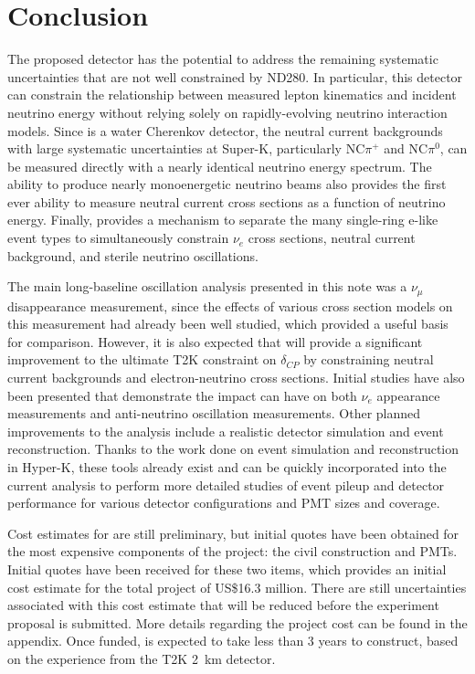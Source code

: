 \section{Conclusion}

The proposed \nuprismlite detector has the potential to address the remaining systematic uncertainties that are not well constrained by ND280. In particular, this detector can constrain the relationship between measured lepton kinematics and incident neutrino energy without relying solely on rapidly-evolving neutrino interaction models. Since \nuprismlite is a water Cherenkov detector, the neutral current backgrounds with large systematic uncertainties at Super-K, particularly NC$\pi^+$ and NC$\pi^0$, can be measured directly with a nearly identical neutrino energy spectrum. The ability to produce nearly monoenergetic neutrino beams also provides the first ever ability to measure neutral current cross sections as a function of neutrino energy. Finally, \nuprismlite provides a mechanism to separate the many single-ring e-like event types to simultaneously constrain $\nu_e$ cross sections, neutral current background, and sterile neutrino oscillations.

The main long-baseline oscillation analysis presented in this note was a $\nu_\mu$ disappearance measurement, since the effects of various cross section models on this measurement had already been well studied, which provided a useful basis for comparison. However, it is also expected that \nuprismlite will provide a significant improvement to the ultimate T2K constraint on $\delta_{CP}$ by constraining neutral current backgrounds and electron-neutrino cross sections. Initial studies have also been presented that demonstrate the impact \nuprismlite can have on both $\nu_e$ appearance measurements and anti-neutrino oscillation measurements. Other planned improvements to the analysis include a realistic detector simulation and event reconstruction. Thanks to the work done on event simulation and reconstruction in Hyper-K, these tools already exist and can be quickly incorporated into the current analysis to perform more detailed studies of event pileup and detector performance for various detector configurations and PMT sizes and coverage.

Cost estimates for \nuprismlite are still preliminary, but initial quotes have been obtained for the most expensive components of the project: the civil construction and PMTs. Initial quotes have been received for these two items, which provides an initial cost estimate for the total project of US\$16.3 million.  There are still uncertainties associated with this cost estimate that will be reduced before the experiment proposal is submitted.  More details regarding the project cost can be found in the appendix. Once funded, \nuprismlite is expected to take less than 3 years to construct, based on the experience from the T2K 2~km detector.

